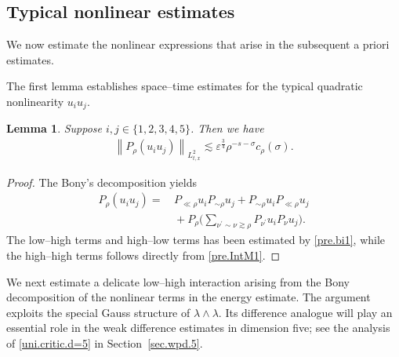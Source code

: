 \documentclass[11pt,letterpaper,reqno]{amsart}
\numberwithin{equation}{section}
\newtheorem{lemma}[theorem]{Lemma}
\theoremstyle{definition}
\theoremstyle{remark}
\begin{document}
\subsection{Typical nonlinear estimates} \label{subsec_non_est2}
We now estimate the nonlinear expressions that arise in the subsequent a priori estimates.   

  
The first lemma establishes space--time estimates for the typical quadratic nonlinearity $u_i u_j$.
\begin{lemma}  \label{lem_l2uiuj}Suppose $ i,j\in\{1,2,3,4,5\} $. Then we have
	\begin{align}\label{lem_l2uiuj_est}
		\left\| P_\rho	(u_i  u_j ) \right\|_{L^2_{t,x}}  \lesssim \varepsilon^{\frac34}\rho^{-s-\sigma} c_\rho(\sigma).
	\end{align}
\end{lemma}
\begin{proof}
The Bony's decomposition yields
\begin{equation}\label{Bon2}
	\begin{aligned}   
		P_{\rho} \left(u_i   u_j \right) 
		=&\,     P_{\ll \rho} u_i P_{\sim \rho }  u_j +	 P_{ \sim \rho } u_i P_{\ll \rho} u_j \\
		&\,+P_\rho \big(\sum_{\nu^\prime \sim \nu  \gtrsim \rho}  	P_{ \nu^{ \prime}} u_i P_{\nu}u_j\big).
	\end{aligned}
 \end{equation}
The low--high terms and high--low terms has been estimated by \eqref{pre.bi1}, while
  the  high--high terms  follows directly from \eqref{pre.IntM1}.
    
	
	\end{proof}








 
We next estimate a delicate low--high interaction arising from the Bony decomposition of the nonlinear terms in the energy estimate. The argument exploits the special Gauss structure of \(\lambda\wedge\lambda\). Its difference analogue will   play an essential role in the weak difference estimates in dimension five; see the analysis of \eqref{uni.critic.d=5} in Section~\ref{sec.wpd.5}.
 
\end{document}
